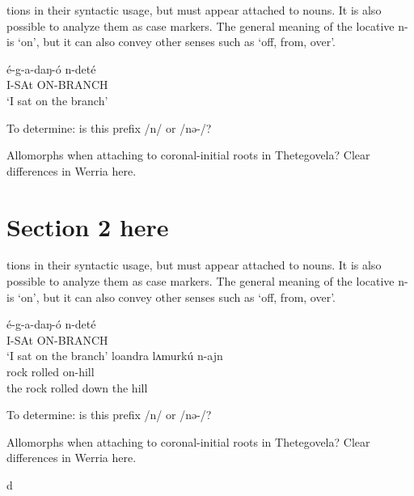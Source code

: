 tions in their syntactic usage, but must appear attached to nouns. It is also possible to analyze them as case markers. The general meaning of the locative n- is `on’, but it can also convey other senses such as `off, from, over’.  

	\ea \gll é-g-a-daŋ-ó n-deté		\\	
			I-SAt ON-BRANCH\\
		\glt `I sat on the branch'	
\z 

To determine: is this prefix /n/ or /nə-/?

Allomorphs when attaching to coronal-initial roots in Thetegovela? Clear differences in Werria here.


\section{Section 2 here}

tions in their syntactic usage, but must appear attached to nouns. It is also possible to analyze them as case markers. The general meaning of the locative n- is `on’, but it can also convey other senses such as `off, from, over’.  

	\ea \gll é-g-a-daŋ-ó n-deté		\\	
			I-SAt ON-BRANCH\\
		\glt `I sat on the branch'	
	\ex \gll loandra lʌmurkú n-ajn		 \\
			rock rolled on-hill\\
		\glt the rock rolled down the hill
\z 

To determine: is this prefix /n/ or /nə-/?

Allomorphs when attaching to coronal-initial roots in Thetegovela? Clear differences in Werria here.

d